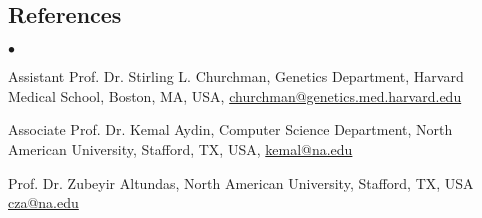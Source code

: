 \documentclass[margin,line]{res}
\newenvironment{list2}{
  \begin{list}{$\bullet$}{%
      \setlength{\itemsep}{0in}
      \setlength{\parsep}{0in} \setlength{\parskip}{0in}
      \setlength{\topsep}{0in} \setlength{\partopsep}{0in} 
      \setlength{\leftmargin}{0.2in}}}{\end{list}}
\begin{document}
\begin{resume}
\section{\sc References} 
\begin{list2}
\item Assistant Prof. Dr. Stirling L. Churchman, Genetics Department, Harvard Medical School, Boston, MA, USA, \href{churchman@genetics.med.harvard.edu}{churchman@genetics.med.harvard.edu}
\item Associate Prof. Dr. Kemal Aydin, Computer Science Department, North American University, Stafford, TX, USA, \href{kemal@na.edu}{kemal@na.edu}
\item Prof. Dr. Zubeyir Altundas, North American University, Stafford, TX, USA \href{	
cza@na.edu}{cza@na.edu} 
\end{list2}


\end{resume}
\end{document}
